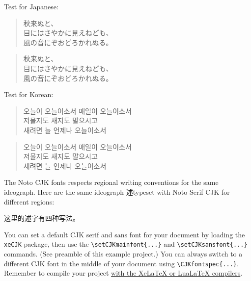 \documentclass{article}
\begin{document}
Test for Japanese:
\begin{multicols}{2}
\begin{verse}
秋来ぬと、\\
目にはさやかに見えねども、\\
風の音にぞおどろかれぬる。
\end{verse}

\begin{verse}
秋来ぬと、\\
目にはさやかに見えねども、\\
風の音にぞおどろかれぬる。
\end{verse}
\end{multicols}


Test for Korean:
\begin{multicols}{2}
\begin{verse}
오늘이 오늘이소서 매일이 오늘이소서\\
저물지도 새지도 말으시고\\
새려면 늘 언제나 오늘이소서
\end{verse}

\begin{verse}
오늘이 오늘이소서 매일이 오늘이소서\\
저물지도 새지도 말으시고\\
새려면 늘 언제나 오늘이소서
\end{verse}
\end{multicols}

The Noto CJK fonts respects regional writing conventions for the same ideograph. Here are the same ideograph 述typeset with Noto Serif CJK for different regions:

\begin{center}
这里的述字有四种写法。
\end{center}

You can set a default CJK serif and sans font for your document by loading the \texttt{xeCJK} package, then use the \verb|\setCJKmainfont{...}| and \verb|\setCJKsansfont{...}| commands. (See preamble of this example project.) You can always switch to a different CJK font in the middle of your document using \verb|\CJKfontspec{...}|. Remember to compile your project \href{https://www.overleaf.com/learn/latex/Choosing_a_LaTeX_Compiler}{with the XeLaTeX or LuaLaTeX compilers}.
\end{document}
